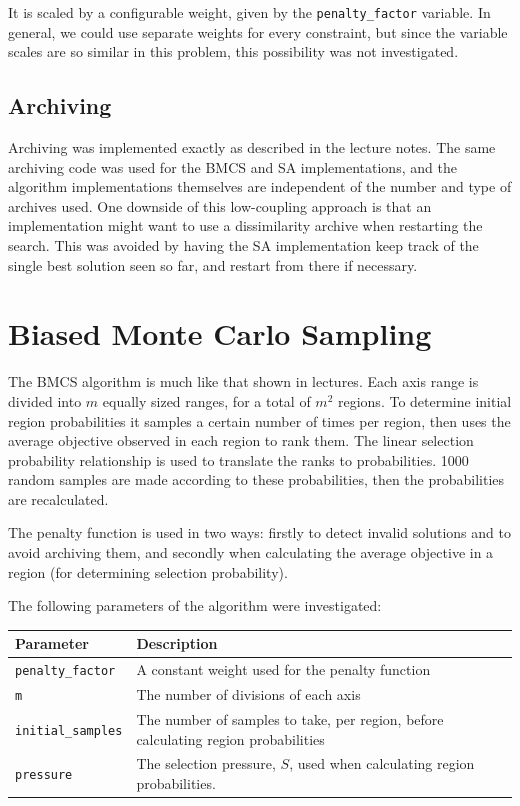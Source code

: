 \documentclass[10pt]{article}
\begin{document}
It is scaled by a configurable weight, given by the \texttt{penalty\_factor}
variable. In general, we could use separate weights for every constraint, but
since the variable scales are so similar in this problem, this possibility was
not investigated.

\subsection{Archiving}

Archiving was implemented exactly as described in the lecture
notes\cite{lnotes}. The same
archiving code was used for the BMCS and SA implementations, and the algorithm
implementations themselves are independent of the number and type of archives
used. One downside of this low-coupling approach is that an implementation
might want to use a dissimilarity archive when restarting the search. This was
avoided by having the SA implementation keep track of the single best solution
seen so far, and restart from there if necessary.

\section{Biased Monte Carlo Sampling}

The BMCS algorithm is much like that shown in lectures\cite{lnotes}. Each axis
range is divided into $m$ equally sized ranges, for a total of $m^2$ regions.
To determine initial region probabilities it samples a certain number of times
per region, then uses the average objective observed in each region to rank
them. The linear selection probability relationship is used to translate the
ranks to probabilities. 1000 random samples are made according to these
probabilities, then the probabilities are recalculated. 

The penalty function is used in two ways: firstly to detect invalid solutions
and to avoid archiving them, and secondly when calculating the average
objective in a region (for determining selection probability).

The following parameters of the algorithm were investigated:

\vspace{5pt}

\begin{tabular}{l | l}
  Parameter & Description \\
  \hline
  \texttt{penalty\_factor} & A constant weight used for the penalty function \\
  \texttt{m} & The number of divisions of each axis \\
  \texttt{initial\_samples} & The number of samples to take, per region, before
  calculating region probabilities \\
  \texttt{pressure} & The selection pressure, $S$, used when calculating region
  probabilities.
\end{tabular}
\end{document}
